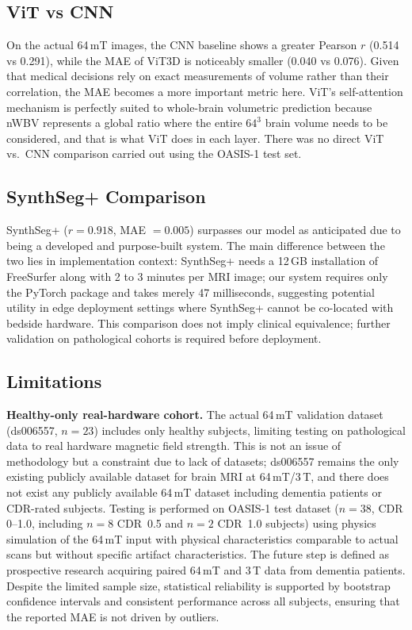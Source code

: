 \documentclass{ieeeaccess}
\begin{document}
\subsection{ViT vs CNN}

On the actual 64\,mT images, the CNN baseline shows a greater Pearson $r$
(0.514 vs 0.291), while the MAE of ViT3D is noticeably smaller (0.040 vs
0.076). Given that medical decisions rely on exact measurements of volume
rather than their correlation, the MAE becomes a more important metric here.
ViT's self-attention mechanism is perfectly suited to whole-brain volumetric
prediction because nWBV represents a global ratio where the entire $64^3$
brain volume needs to be considered, and that is what ViT does in each layer.
There was no direct ViT vs.\ CNN comparison carried out using the OASIS-1 test
set.

\subsection{SynthSeg+ Comparison}

SynthSeg+ ($r = 0.918$, MAE $= 0.005$) surpasses our model as anticipated due
to being a developed and purpose-built system. The main difference between the
two lies in implementation context: SynthSeg+ needs a 12\,GB installation of
FreeSurfer along with 2 to 3 minutes per MRI image; our system requires only
the PyTorch package and takes merely 47 milliseconds, suggesting potential
utility in edge deployment settings where SynthSeg+ cannot be co-located with
bedside hardware. This comparison does not imply clinical equivalence;
further validation on pathological cohorts is required before deployment.

\subsection{Limitations}
\label{sec:limitations}

\textbf{Healthy-only real-hardware cohort.}
The actual 64\,mT validation dataset (ds006557, $n = 23$) includes only
healthy subjects, limiting testing on pathological data to real hardware
magnetic field strength. This is not an issue of methodology but a constraint
due to lack of datasets; ds006557 remains the only existing publicly available
dataset for brain MRI at 64\,mT/3\,T, and there does not exist any publicly
available 64\,mT dataset including dementia patients or CDR-rated subjects.
Testing is performed on OASIS-1 test dataset ($n = 38$, CDR 0--1.0, including
$n = 8$ CDR~0.5 and $n = 2$ CDR~1.0 subjects) using physics simulation of
the 64\,mT input with physical characteristics comparable to actual scans but
without specific artifact characteristics. The future step is defined as
prospective research acquiring paired 64\,mT and 3\,T data from dementia
patients. Despite the limited sample size, statistical reliability is
supported by bootstrap confidence intervals and consistent performance
across all subjects, ensuring that the reported MAE is not driven by
outliers.
\end{document}
